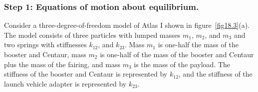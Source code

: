 \documentclass{AeroStructure-ERJohnson}
\begin{document}
\subsubsection{Step 1: Equations of motion about equilibrium.}\label{step1} Consider a three-degree-of-freedom model of Atlas I shown in figure~\ref{fig18.3}(a). The model consists of three particles with lumped masses $m_1$, $m_2$, and $m_3$ and two springs with stiffnesses $k_{12}$, and $k_{23}$. Mass $m_1$ is one-half the mass of the booster and Centaur, mass $m_2$ is one-half of the mass of the booster and Centaur plus the mass of the fairing, and mass $m_3$ is the mass of the payload. The stiffness of the booster and Centaur is represented by $k_{12}$, and the stiffness of the launch vehicle adapter is represented by $k_{23}$.

{\def\thefigure{18.3}
}
\end{document}
